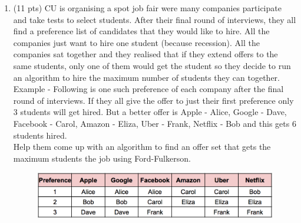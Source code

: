 \documentclass[12pt]{article}
\theoremstyle{remark}
\newtheorem*{solution}{Solution}
\begin{document}
\begin{enumerate}
\begin{enumerate}
    \item (5 pts) Use the above proof (from part Q3a) to prove that the value of the flow $a$ $\leq$ Capacity of the cut $(X, Y)$.
\begin{solution}
Another fundamental property of a flow network is the fact that a flow cannot exceed the capacity of an edge. If the flow $a$ exceeds that capacity of the cut, then it would be violating the rule that was just proved above. If $$\sum_{\text{e out of V}} f(e) > \sum_{\text{all edges in cut}}f(e)$$ then the the flow out of the cut must be equal to the flow into the cut by the flow conservation property. If this is the case, then it is violating an essential rule of flow networks. Either there would be verticies that are retaining flow, or the capacity would be broken, both of which constitute an invalid flow. 
\end{solution}
\end{enumerate}



\pagebreak

\item (11 pts) CU is organising a spot job fair were many companies participate and take tests to select students. After their final round of interviews, they all find a preference list of candidates that they would like to hire. All the companies just want to hire one student (because recession). All the companies sat together and they realised that if they extend offers to the same students, only one of them would get the student so they decide to run an algorithm to hire the maximum number of students they can together. \\
Example - Following is one such preference of each company after the final round of interviews. If they all give the offer to just their first preference only 3 students will get hired. But a better offer is Apple - Alice, Google - Dave, Facebook - Carol, Amazon - Eliza, Uber - Frank, Netflix - Bob and this gets 6 students hired. \\

Help them come up with an algorithm to find an offer set that gets the maximum students the job using Ford-Fulkerson.
\begin{figure}[h!]
\begin{center}
\includegraphics[scale=0.8]{Job.png}
\end{center}
\end{figure}


\end{enumerate}
\end{document}
